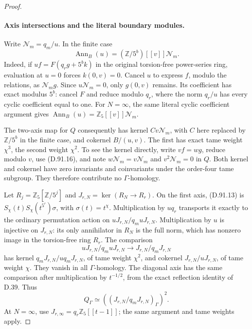 \begin{proof}
\paragraph{Axis intersections and the literal boundary modules.}
Write \(\mathcal N_m=q_m/u\). In the finite case
\[
                 \operatorname{Ann}_B(u)
                   =(\mathbb Z/5^b)[[v]]\mathcal N_m.
                                                               \tag{D.91.16}
\]
Indeed, if \(uf=F(q_rg+5^b k)\) in the original
torsion-free power-series ring, evaluation at \(u=0\)
forces \(k(0,v)=0\). Cancel \(u\) to express \(f\),
modulo the relations, as \(\mathcal N_m g\). Since
\(u\mathcal N_m=0\), only \(g(0,v)\) remains. Its
coefficient has exact modulus \(5^b\): cancel \(F\)
and reduce modulo \(q_r\), where the norm
\(q_r/u\) has every cyclic coefficient equal to one.
For \(N=\infty\), the same literal cyclic coefficient
argument gives \(\operatorname{Ann}_B(u)=\mathbb Z_5[[v]]\mathcal N_m\).

The two-axis map for \(Q\) consequently has kernel
\(Cv\mathcal N_m\), with \(C\) here replaced by
\(\mathbb Z/5^b\) in the finite case, and cokernel
\(B/(u,v)\). The first has exact tame weight \(\chi^3\),
the second weight \(\chi^2\). To see the kernel directly,
write \(vf=wg\), reduce modulo \(v\), use (D.91.16),
and note \(w\mathcal N_m=v\mathcal N_m\) and
\(v^2\mathcal N_m=0\) in \(Q\). Both kernel and
cokernel have zero invariants and coinvariants under the
order-four tame subgroup. They therefore contribute no
\(\Gamma\)-homology.

Let \(R_j=\mathbb Z_5[\mathbb Z/5^j]\) and
\(J_{r,N}=\ker(R_N\to R_r)\). On the first axis,
(D.91.13) is
\(S_\chi(t)S_\chi(t^{5^r})\sigma\), with
\(\sigma(t)=t^\chi\). Multiplication by \(u q_r\)
transports it exactly to the ordinary permutation action on
\(uJ_{r,N}/q_m uJ_{r,N}\). Multiplication by \(u\)
is injective on \(J_{r,N}\): its only annihilator in
\(R_N\) is the full norm, which has nonzero image in
the torsion-free ring \(R_r\). The comparison
\[
       uJ_{r,N}/q_m uJ_{r,N}
                      \longrightarrow J_{r,N}/q_mJ_{r,N}
                                                               \tag{D.91.17}
\]
has kernel \(q_mJ_{r,N}/u q_mJ_{r,N}\), of tame
weight \(\chi^2\), and cokernel \(J_{r,N}/uJ_{r,N}\),
of tame weight \(\chi\). They vanish in all
\(\Gamma\)-homology. The diagonal axis has the same
comparison after multiplication by \(t^{-1/2}\), from
the exact reflection identity of D.39. Thus
\[
 Q_\Gamma\simeq
          \left((J_{r,N}/q_mJ_{r,N})_\Gamma\right)^2.
                                                               \tag{D.91.18}
\]
At \(N=\infty\), use \(J_{r,\infty}=q_r\mathbb Z_5[[t-1]]\);
the same argument and tame weights apply.


\end{proof}
